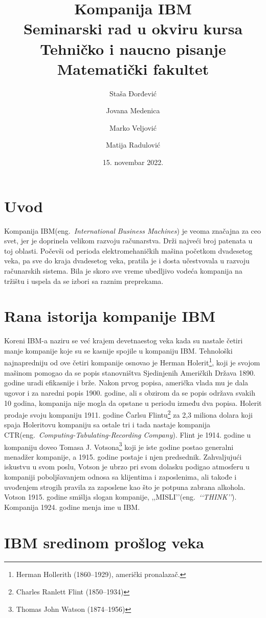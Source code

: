 \documentclass[a4paper]{article}
\title{Kompanija IBM \\
\normalsize Seminarski rad u okviru kursa\\ Tehničko i naucno pisanje
\\Matematički fakultet}
\author{Staša Đorđević \and
Jovana Medenica \and
Marko Veljović \and
Matija Radulović} %
\date{15. novembar 2022.} %
\begin{document}
\maketitle
\tableofcontents
\section{Uvod}
Kompanija IBM(eng.~{\em International Business Machines}) je veoma značajna za ceo svet, jer je doprinela velikom razvoju računarstva. Drži najveći broj patenata u toj oblasti. Počevši od perioda elektromehaničkih mašina početkom dvadesetog veka, pa sve do kraja dvadesetog veka, pratila je i dosta učestvovala u razvoju računarskih sistema. Bila je skoro sve vreme ubedljivo vodeća kompanija na tržištu i uspela da se izbori sa raznim preprekama.

\section{Rana istorija kompanije IBM}
Koreni IBM-a naziru se već krajem devetnaestog veka kada su nastale četiri manje kompanije koje su se kasnije spojile u kompaniju IBM. Tehnološki najnapredniju od ove četiri kompanije osnovao je Herman Holerit\footnote[1]{Herman Hollerith (1860–1929), američki pronalazač.}, koji je svojom mašinom pomogao da se popis stanovništva Sjedinjenih Američkih Država 1890. godine uradi efikasnije i brže. Nakon prvog popisa, američka vlada mu je dala ugovor i za naredni popis 1900. godine, ali s obzirom da se popis održava svakih 10 godina, kompanija nije mogla da opstane u periodu između dva popisa. Holerit prodaje svoju kompaniju 1911. godine Čarlsu Flintu\footnote[2]{Charles Ranlett Flint (1850–1934)} za 2,3 miliona dolara koji spaja Holeritovu kompaniju sa ostale tri i tada nastaje kompanija CTR(eng.~{\em Computing-Tabulating-Recording Company}). Flint je 1914. godine u kompaniju doveo Tomasa J. Votsona\footnote[3]{Thomas John Watson (1874–1956)} koji je iste godine postao generalni menadžer kompanije, a 1915. godine postaje i njen predsednik. Zahvaljujući iskustvu u svom poslu, Votson je ubrzo pri svom dolasku podigao atmosferu u kompaniji poboljšavanjem odnosa sa klijentima i zaposlenima, ali takođe i uvođenjem strogih pravila za zaposlene kao što je potpuna zabrana alkohola. Votson 1915. godine smišlja slogan kompanije, ,,MISLI’’(eng.~{\em ‘‘THINK’’}). Kompanija 1924. godine menja ime u IBM.

\section{IBM sredinom prošlog veka}
\end{document}
